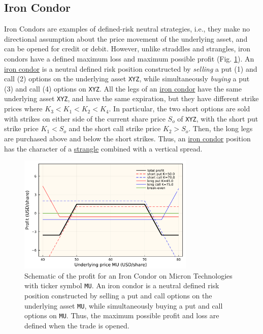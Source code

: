 \documentclass[11pt]{article}
\theoremstyle{definition}
\begin{document}
\subsection*{Iron Condor}
Iron Condors are examples of defined-risk neutral strategies, i.e., they make no directional assumption about the price movement of the underlying asset, 
and can be opened for credit or debit.
However, unlike straddles and strangles, iron condors have a defined maximum loss and maximum possible profit (Fig. \ref{fig:options-iron-condor-profit}).
An \href{https://www.investopedia.com/terms/i/ironcondor.asp}{iron condor} is a neutral defined risk position constructed 
by \textit{selling} a put (1) and call (2) options on the underlying asset \texttt{XYZ}, 
while simultaneously \textit{buying} a put (3) and call (4) options on \texttt{XYZ}. 
All the legs of an \href{https://www.investopedia.com/terms/i/ironcondor.asp}{iron condor} have the same underlying asset \texttt{XYZ}, 
and have the same expiration, but they have different strike prices where $K_{3}<K_{1}<K_{2}<K_{4}$. 
In particular, the two short options are sold with strikes on either side of the current share price $S_{o}$ of \texttt{XYZ}, 
with the short put strike price $K_{1}<S_{o}$ and the short call strike price $K_{2}>S_{o}$. 
Then, the long legs are purchased above and below the short strikes.  
Thus, an \href{https://www.investopedia.com/terms/i/ironcondor.asp}{iron condor} position has the character of a 
\href{https://www.investopedia.com/terms/s/strangle.asp}{strangle} combined with a vertical spread. 

\begin{figure}[h]
    \centering
    \includegraphics[width=0.75\textwidth]{./figs/Fig-MU-Profit-IronCondor.pdf}
    \caption{Schematic of the profit for an Iron Condor on Micron Technologies with ticker symbol \texttt{MU}.
	An iron condor is a neutral defined risk position constructed by selling a put and call options on the underlying asset \texttt{MU},
	while simultaneously buying a put and call options on \texttt{MU}. Thus, the maximum possible profit and loss are defined when the trade is opened.
	}\label{fig:options-iron-condor-profit}
\end{figure}
\end{document}
